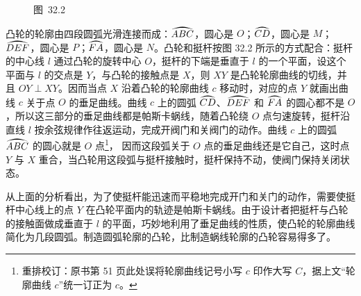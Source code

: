 \begin{figure}[htbp]
\begin{minipage}[b]{0.48\textwidth}
    \caption*{图\ 32.2}
  \end{minipage}
\end{figure}

凸轮的轮廓由四段圆弧光滑连接而成：$\arc{ABC}$，圆心是 $O$；$\arc{CD}$，圆心是 $M$；$\arc{DEF}$，圆心是 $P$；$\arc{FA}$，圆心是 $N$。凸轮和挺杆按图 32.2 所示的方式配合：挺杆的中心线 $l$ 通过凸轮的旋转中心 $O$，挺杆的下端是垂直于 $l$ 的一个平面，设这个平面与 $l$ 的交点是 $Y$，与凸轮的接触点是 $X$，则 $XY$ 是凸轮轮廓曲线的切线，并且 $OY\perp XY$。因而当点 $X$ 沿着凸轮的轮廓曲线 $c$ 移动时，对应的点 $Y$ 就画出曲线 $c$ 关于点 $O$ 的垂足曲线。曲线 $c$ 上的圆弧 $\arc{CD}$、$\arc{DEF}$ 和 $\arc{FA}$ 的圆心都不是 $O$，所以这三部分的垂足曲线都是帕斯卡蜗线，随着凸轮绕 $O$ 点匀速旋转，挺杆沿直线 $l$ 按余弦规律作往返运动，完成开阀门和关阀门的动作。曲线 $c$ 上的圆弧 $\arc{ABC}$ 的圆心就是 $O$ 点\footnote{重排校订：原书第 51 页此处误将轮廓曲线记号小写 $c$ 印作大写 $C$，据上文“轮廓曲线 $c$”统一订正为 $c$。}，%
因而这段弧关于 $O$ 点的垂足曲线还是它自己，这时点 $Y$ 与 $X$ 重合，当凸轮用这段弧与挺杆接触时，挺杆保持不动，使阀门保持关闭状态。

从上面的分析看出，为了使挺杆能迅速而平稳地完成开门和关门的动作，需要使挺杆中心线上的点 $Y$ 在凸轮平面内的轨迹是帕斯卡蜗线。由于设计者把挺杆与凸轮的接触面做成垂直于 $l$ 的平面，巧妙地利用了垂足曲线的性质，使凸轮的轮廓曲线简化为几段圆弧。制造圆弧轮廓的凸轮，比制造蜗线轮廓的凸轮容易得多了。
